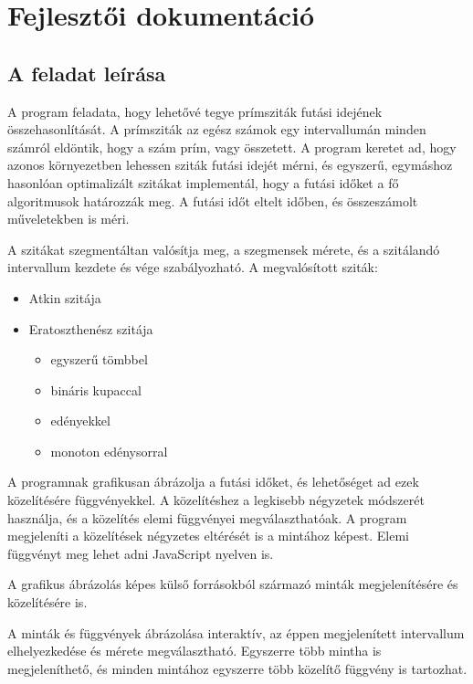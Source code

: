 \chapter{Fejlesztői dokumentáció}

\section{A feladat leírása}

A program feladata, hogy lehetővé tegye prímsziták futási idejének összehasonlítását.
A prímsziták az egész számok egy intervallumán minden számról eldöntik, hogy a szám prím, vagy összetett.
A program keretet ad, hogy azonos környezetben lehessen sziták futási idejét mérni, és egyszerű, egymáshoz hasonlóan optimalizált szitákat implementál, hogy a futási időket a fő algoritmusok határozzák meg.
A futási időt eltelt időben, és összeszámolt műveletekben is méri.

A szitákat szegmentáltan valósítja meg, a szegmensek mérete, és a szitálandó intervallum kezdete és vége szabályozható.
A megvalósított sziták:
\begin{itemize}
\item Atkin szitája
\item Eratoszthenész szitája
\begin{itemize}
\item egyszerű tömbbel
\item bináris kupaccal
\item edényekkel
\item monoton edénysorral
\end{itemize}
\end{itemize}

A programnak grafikusan ábrázolja a futási időket, és lehetőséget ad ezek közelítésére függvényekkel.
A közelítéshez a legkisebb négyzetek módszerét használja, és a közelítés elemi függvényei megválaszthatóak.
A program megjeleníti a közelítések négyzetes eltérését is a mintához képest.
Elemi függvényt meg lehet adni JavaScript nyelven is.

A grafikus ábrázolás képes külső forrásokból származó minták megjelenítésére és közelítésére is.

A minták és függvények ábrázolása interaktív, az éppen megjelenített intervallum elhelyezkedése és mérete megválasztható.
Egyszerre több mintha is megjeleníthető, és minden mintához egyszerre több közelítő függvény is tartozhat.

